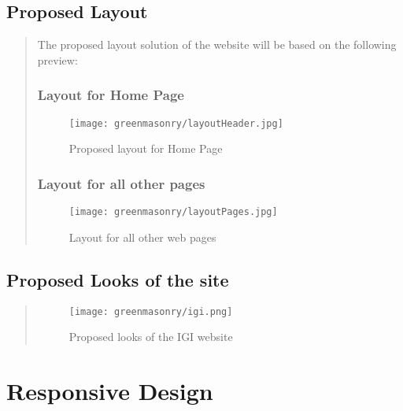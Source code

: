 \documentclass[35pt]{report}
\begin{document}
			\clearpage
			\subsection{Proposed Layout}
			\begin{quote}
			The proposed layout solution of the website will be based on the following preview: 

				\subsubsection{Layout for Home Page}
				\begin{figure}[htb]
					\begin{center}
					{\texttt{[image: greenmasonry/layoutHeader.jpg]}}
					{\caption{Proposed layout for Home Page}}
					\end{center}
				\end{figure}
			
				\subsubsection{Layout for all other pages}
				\begin{figure}[htb]
					\begin{center}
					{\texttt{[image: greenmasonry/layoutPages.jpg]}}
					{\caption{Layout for all other web pages}}
					\end{center}
				\end{figure}
			\end{quote}
			\clearpage

			\subsection{Proposed Looks of the site}
			\begin{quote}
			\begin{figure}[htb]
					\begin{center}
					{\texttt{[image: greenmasonry/igi.png]}}
					{\caption{Proposed looks of the IGI website}}
					\end{center}
				\end{figure}
			\end{quote}
			\clearpage
		
		\section{Responsive Design}
\end{document}
